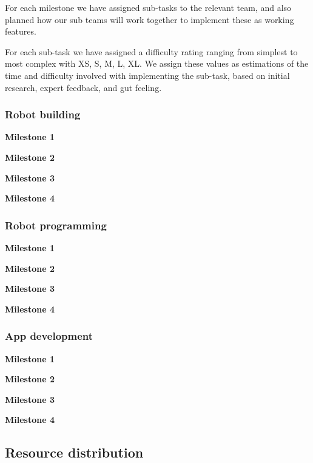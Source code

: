 \documentclass{article}
\begin{document}
For each milestone we have assigned sub-tasks to the relevant team, and also planned how our sub teams will work together to implement these as working features.

For each sub-task we have assigned a difficulty rating ranging from simplest to most complex with XS, S, M, L, XL. We assign these values as estimations of the time and difficulty involved with implementing the sub-task, based on initial research, expert feedback, and gut feeling. 


\subsubsection{Robot building}

{\bf Milestone 1}

{\bf Milestone 2}

{\bf Milestone 3}

{\bf Milestone 4}


\subsubsection{Robot programming}

{\bf Milestone 1}

{\bf Milestone 2}

{\bf Milestone 3}

{\bf Milestone 4}

\subsubsection{App development}

{\bf Milestone 1}

{\bf Milestone 2}

{\bf Milestone 3}

{\bf Milestone 4}


\subsection{Resource distribution}
\end{document}

